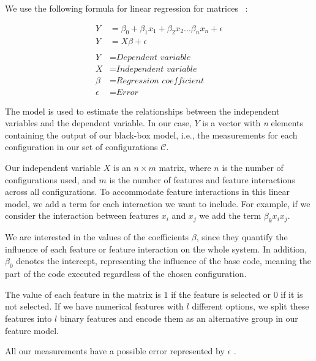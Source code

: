 We use the following formula for linear regression for matrices ~\cite{Linear-Regression-Performance}:

\begin{align}\label{formula:linReg}
    Y &= \beta_0 + \beta_1 x_1 + \beta_2 x_2 ... \beta_n x_n + \epsilon   \\
    Y &= X \beta + \epsilon \nonumber\\ \nonumber \\ \nonumber
    Y &= \textit{Dependent variable}\\ \nonumber
    X &= \textit{Independent variable}\\ \nonumber
    \beta &= \textit{Regression coefficient}\\ \nonumber
    \epsilon &= \textit{Error} \nonumber
\end{align}

The model is used to estimate the relationships between the independent variables and the dependent variable.
In our case, $Y$ is a vector with \textit{n}  elements containing the output of our black-box model,
i.e., the measurements for each configuration in our set of configurations $\mathcal{C}$. 

Our independent variable $X$ is an $n \times m$ matrix, where $n$ is the number of configurations used, 
and $m$ is the number of features and feature interactions across all configurations. 
To accommodate feature interactions in this linear model, we add a term for each interaction we want to include. 
For example, if we consider the interaction between features $x_i$ and $x_j$ we add the term $\beta_k x_i x_j$. 

We are interested in the values of the coefficients $\beta$, since they quantify the influence of each feature or feature interaction on the whole system. 
In addition, $\beta_0$ denotes the intercept, representing the influence of the base code, 
meaning the part of the code executed regardless of the chosen configuration.

The value of each feature in the matrix is $1$ if the feature is selected or $0$ if it is not selected.  If we have numerical features with $l$ different options, 
we split these features into $l$ binary features and encode them as an alternative group in our feature model.

All our measurements have a possible error represented by $\epsilon$ \cite{Linear-Regression}.


